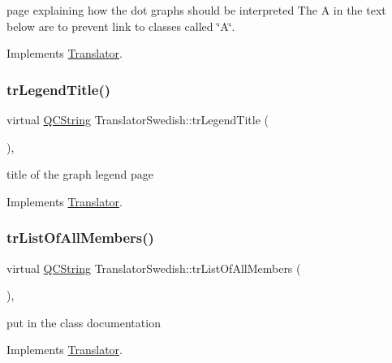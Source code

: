 page explaining how the dot graph\textquotesingle{}s should be interpreted The A in the text below are to prevent link to classes called \char`\"{}\+A\char`\"{}. 

Implements \mbox{\hyperlink{class_translator}{Translator}}.

\mbox{\label{class_translator_swedish_a11ca810068c2245c440f0285928cc98b}} 
\subsubsection{\texorpdfstring{trLegendTitle()}{trLegendTitle()}}
{\footnotesize\ttfamily virtual \mbox{\hyperlink{class_q_c_string}{Q\+C\+String}} Translator\+Swedish\+::tr\+Legend\+Title (\begin{DoxyParamCaption}{ }\end{DoxyParamCaption})\hspace{0.3cm}{\ttfamily [inline]}, {\ttfamily [virtual]}}

title of the graph legend page 

Implements \mbox{\hyperlink{class_translator}{Translator}}.

\mbox{\label{class_translator_swedish_a0e98147c3c73f79fba668ec0dee85403}} 
\subsubsection{\texorpdfstring{trListOfAllMembers()}{trListOfAllMembers()}}
{\footnotesize\ttfamily virtual \mbox{\hyperlink{class_q_c_string}{Q\+C\+String}} Translator\+Swedish\+::tr\+List\+Of\+All\+Members (\begin{DoxyParamCaption}{ }\end{DoxyParamCaption})\hspace{0.3cm}{\ttfamily [inline]}, {\ttfamily [virtual]}}

put in the class documentation 

Implements \mbox{\hyperlink{class_translator}{Translator}}.

\mbox{\label{class_translator_swedish_a4e0e917690d93ba161c201402eb7d4c7}} 
